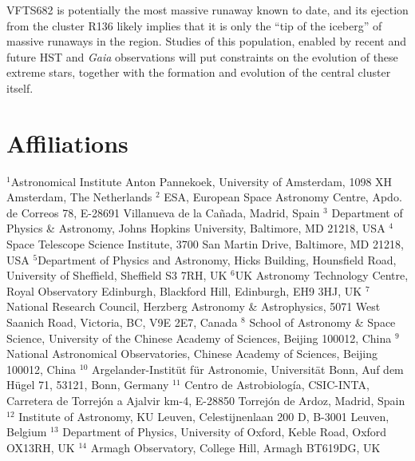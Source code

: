 \documentclass[a4paper,fleqn,usenatbib]{mnras}
\begin{document}
VFTS682 is potentially the most massive runaway known to date, and its ejection
from the cluster R136 likely implies that it is only the ``tip of the
iceberg'' of massive runaways in the
region. Studies of this population, enabled by recent and future HST and \emph{Gaia} observations will put constraints on the evolution
of these extreme stars, together with the formation and evolution of
the central cluster itself.
\vspace*{-40pt}




\label{lastpage}

\vspace*{-20pt}
\section*{Affiliations}
 \tiny
\noindent $^{1}${Astronomical Institute Anton Pannekoek, University of
    Amsterdam, 1098 XH Amsterdam, The Netherlands} 
  $^{2}$ {ESA, European Space Astronomy Centre, Apdo. de Correos 78,
    E-28691 Villanueva de la Ca\~nada, Madrid, Spain} 
 $^{3}$ {
 Department of Physics \& Astronomy, Johns Hopkins University, Baltimore, MD 21218, USA}
  $^{4}$ {Space Telescope Science Institute, 3700 San Martin Drive,
    Baltimore, MD 21218, USA}
  $^{5}${Department of Physics and Astronomy, Hicks Building,
    Hounsfield Road, University of Sheffield, Sheffield S3 7RH, UK}
  $^{6}${UK Astronomy Technology Centre, Royal Observatory Edinburgh, Blackford Hill, Edinburgh, EH9 3HJ, UK}
  $^{7}$ {National Research Council, Herzberg Astronomy \&
    Astrophysics, 5071 West Saanich Road, Victoria, BC, V9E 2E7,
    Canada}
  $^{8}$ {School of Astronomy \& Space Science, University of the Chinese
    Academy of Sciences, Beijing 100012, China}
  $^{9}$ {National Astronomical Observatories, Chinese Academy of
    Sciences, Beijing 100012, China}
  $^{10}$ {Argelander-Instit\"ut f\"ur Astronomie, Universit\"at Bonn,
    Auf dem H\"ugel 71, 53121, Bonn, Germany}
  $^{11}$ {Centro de Astrobiolog\'ia, CSIC-INTA, Carretera de Torrej\'on a Ajalvir km-4, E-28850 Torrej\'on de Ardoz, Madrid, Spain}
  $^{12}$ {Institute of Astronomy, KU Leuven, Celestijnenlaan 200 D, B-3001 Leuven, Belgium}
  $^{13}$ {Department of Physics, University of Oxford, Keble Road,
    Oxford OX13RH, UK} 
  $^{14}$ {Armagh Observatory, College Hill, Armagh BT619DG, UK}\\
\end{document}
